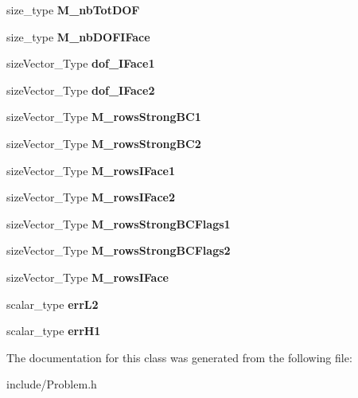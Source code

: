 \begin{DoxyCompactItemize}
\mbox{\label{classProblem_adfaa9675ea08cf5c2d065bf2f36c7d7e}} 
size\+\_\+type {\bfseries M\+\_\+nb\+Tot\+D\+OF}
\item 
\mbox{\label{classProblem_a4ce76c46126d25342e73ce18f1d3d3d5}} 
size\+\_\+type {\bfseries M\+\_\+nb\+D\+O\+F\+I\+Face}
\item 
\mbox{\label{classProblem_aafbd2c4d0d3588a954ae8717c135f7d0}} 
size\+Vector\+\_\+\+Type {\bfseries dof\+\_\+\+I\+Face1}
\item 
\mbox{\label{classProblem_a1c097b4821a74b905425fbeb01d0538e}} 
size\+Vector\+\_\+\+Type {\bfseries dof\+\_\+\+I\+Face2}
\item 
\mbox{\label{classProblem_a7e0bd68b773ed40697b39dbcc4553028}} 
size\+Vector\+\_\+\+Type {\bfseries M\+\_\+rows\+Strong\+B\+C1}
\item 
\mbox{\label{classProblem_ac823a2f940b05233c409f43ac6534614}} 
size\+Vector\+\_\+\+Type {\bfseries M\+\_\+rows\+Strong\+B\+C2}
\item 
\mbox{\label{classProblem_a0f9c035b48c51e47c4d0b599cdfe066b}} 
size\+Vector\+\_\+\+Type {\bfseries M\+\_\+rows\+I\+Face1}
\item 
\mbox{\label{classProblem_a5c40e1402096cf9b3be7064ceea60a09}} 
size\+Vector\+\_\+\+Type {\bfseries M\+\_\+rows\+I\+Face2}
\item 
\mbox{\label{classProblem_ae84ced970386d902740ebbb07d0772f5}} 
size\+Vector\+\_\+\+Type {\bfseries M\+\_\+rows\+Strong\+B\+C\+Flags1}
\item 
\mbox{\label{classProblem_a2c799490f17fe212e09c81c6c70a9f78}} 
size\+Vector\+\_\+\+Type {\bfseries M\+\_\+rows\+Strong\+B\+C\+Flags2}
\item 
\mbox{\label{classProblem_a01b46d314a82c76c0e802cb6e8996ff2}} 
size\+Vector\+\_\+\+Type {\bfseries M\+\_\+rows\+I\+Face}
\item 
\mbox{\label{classProblem_a0868fc95f602e2d5d29bdf10839d5e61}} 
scalar\+\_\+type {\bfseries err\+L2}
\item 
\mbox{\label{classProblem_a3ba525f8acc9dc318dad1244f1d0c67f}} 
scalar\+\_\+type {\bfseries err\+H1}
\end{DoxyCompactItemize}


The documentation for this class was generated from the following file\+:\begin{DoxyCompactItemize}
\item 
include/Problem.\+h\end{DoxyCompactItemize}
